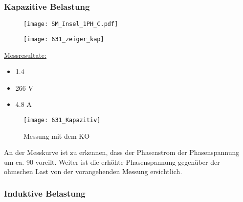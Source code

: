 \begin{flushleft}
\subsubsection{Kapazitive Belastung}

\begin{figure}[H]
\begin{minipage}[t]{0.55\textwidth}
\centering
\texttt{[image: SM\_Insel\_1PH\_C.pdf]}
\label{fig:abb1}
\end{minipage}
\begin{minipage}[t]{0.4\textwidth}
\centering
\texttt{[image: 631\_zeiger\_kap]}
    \label{fig:abb1}
\end{minipage}
\end{figure}


\underline{Messresultate:}\\
\vspace{0.3cm}


\begin{itemize}
\item {}            1.4\degree
\item {}            266 V
\item {}            4.8 A
\end{itemize}

\vspace{0.5cm}

\begin{figure}[H]
    \centering
    \texttt{[image: 631\_Kapazitiv]}
    \caption{Messung mit dem KO}
    \label{fig:abb1}
\end{figure}

An der Messkurve ist zu erkennen, dass der Phasenstrom der Phasenspannung um ca. 90 \degree voreilt. Weiter ist die erhöhte Phasenspannung gegenüber der ohmschen Last von der vorangehenden Messung ersichtlich. 









\newpage




\subsubsection{Induktive Belastung}


\end{flushleft}
